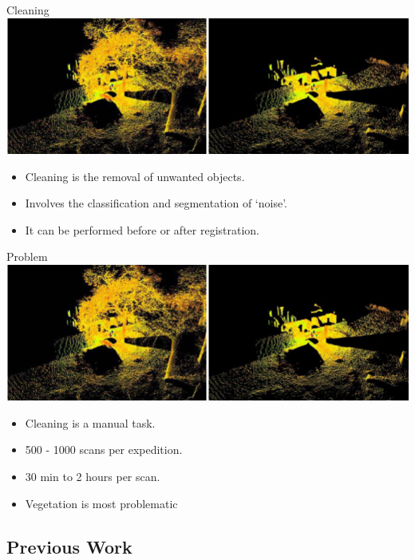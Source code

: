 \documentclass{beamer}
\begin{document}
\begin{frame}{Cleaning}
  \includegraphics[width=1\textwidth]{pics/cleaning.png}
  \begin{itemize}
  \item
  Cleaning is the removal of unwanted objects.
  \item
  Involves the classification and segmentation of `noise'.
  \item
  It can be performed before or after registration.
  \end{itemize}
\end{frame}

\begin{frame}{Problem}
  \includegraphics[width=1\textwidth]{pics/cleaning.png}
  \begin{itemize}
  \item
  Cleaning is a manual task.
  \item
  500 - 1000 scans per expedition.
  \item
  30 min to 2 hours per scan.
  \item
  Vegetation is most problematic
  \end{itemize}
\end{frame}

\subsection{Previous Work}
\end{document}
